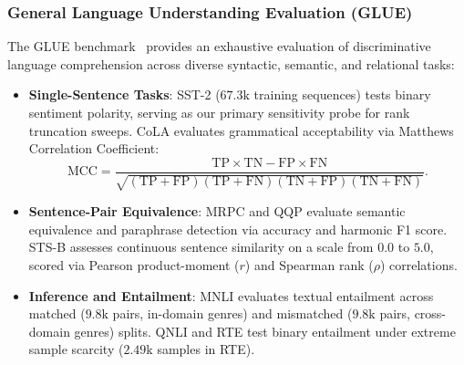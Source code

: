 \subsubsection{General Language Understanding Evaluation (GLUE)}
The GLUE benchmark~\cite{wang2018glue} provides an exhaustive evaluation of discriminative language comprehension across diverse syntactic, semantic, and relational tasks:
\begin{itemize}
    \item \textbf{Single-Sentence Tasks}: SST-2 ($67.3\text{k}$ training sequences) tests binary sentiment polarity, serving as our primary sensitivity probe for rank truncation sweeps. CoLA evaluates grammatical acceptability via Matthews Correlation Coefficient:
    \begin{equation}
    \text{MCC} = \frac{\text{TP} \times \text{TN} - \text{FP} \times \text{FN}}{\sqrt{(\text{TP}+\text{FP})(\text{TP}+\text{FN})(\text{TN}+\text{FP})(\text{TN}+\text{FN})}}.
    \end{equation}
    \item \textbf{Sentence-Pair Equivalence}: MRPC and QQP evaluate semantic equivalence and paraphrase detection via accuracy and harmonic F1 score. STS-B assesses continuous sentence similarity on a scale from $0.0$ to $5.0$, scored via Pearson product-moment ($r$) and Spearman rank ($\rho$) correlations.
    \item \textbf{Inference and Entailment}: MNLI evaluates textual entailment across matched ($9.8\text{k}$ pairs, in-domain genres) and mismatched ($9.8\text{k}$ pairs, cross-domain genres) splits. QNLI and RTE test binary entailment under extreme sample scarcity ($2.49\text{k}$ samples in RTE).
\end{itemize}

